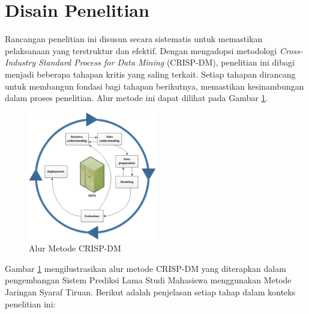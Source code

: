 \section{Disain Penelitian}

Rancangan penelitian ini disusun secara sistematis untuk memastikan pelaksanaan yang terstruktur dan efektif. Dengan mengadopsi metodologi \textit{Cross-Industry Standard Process for Data Mining} (CRISP-DM), penelitian ini dibagi menjadi beberapa tahapan kritis yang saling terkait. Setiap tahapan dirancang untuk membangun fondasi bagi tahapan berikutnya, memastikan kesinambungan dalam proses penelitian. Alur metode ini dapat dilihat pada Gambar \ref{fig:crisp-dm-overview}.

\begin{figure}[htbp]
    \centering
    \includegraphics[width=0.5\textwidth]{images/crisp-dm-overview.jpg}
    \caption{Alur Metode CRISP-DM \cite{IBM2022}}
    \label{fig:crisp-dm-overview}
\end{figure}

Gambar \ref{fig:crisp-dm-overview} mengilustrasikan alur metode CRISP-DM yang diterapkan dalam pengembangan Sistem Prediksi Lama Studi Mahasiswa menggunakan Metode Jaringan Syaraf Tiruan. Berikut adalah penjelasan setiap tahap dalam konteks penelitian ini:

